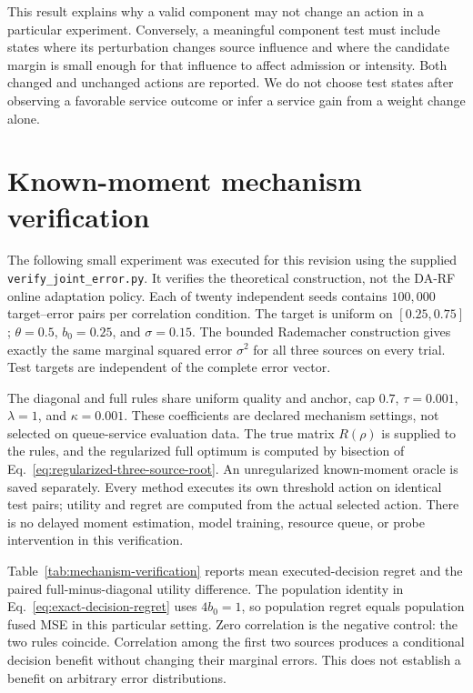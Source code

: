 This result explains why a valid component may not change an action in a
particular experiment. Conversely, a meaningful component test must include
states where its perturbation changes source influence and where the candidate
margin is small enough for that influence to affect admission or intensity.
Both changed and unchanged actions are reported. We do not choose test states
after observing a favorable service outcome or infer a service gain from a
weight change alone.

\section{Known-moment mechanism verification}
\label{sec:known-moment-verification}

The following small experiment was executed for this revision using the supplied
\texttt{verify\_joint\_error.py}. It verifies the theoretical construction,
not the DA-RF online adaptation policy. Each of twenty independent seeds
contains $100{,}000$ target--error pairs per correlation condition. The target
is uniform on $[0.25,0.75]$; $\theta=0.5$, $b_0=0.25$, and $\sigma=0.15$.
The bounded Rademacher construction gives exactly the same marginal squared
error $\sigma^2$ for all three sources on every trial. Test targets are
independent of the complete error vector.

The diagonal and full rules share uniform quality and anchor, cap $0.7$,
$\tau=0.001$, $\lambda=1$, and $\kappa=0.001$. These coefficients are declared
mechanism settings, not selected on queue-service evaluation data. The true
matrix $R(\rho)$ is supplied to the rules, and the regularized full optimum is
computed by bisection of Eq.~\eqref{eq:regularized-three-source-root}.
An unregularized known-moment oracle is saved separately. Every method executes
its own threshold action on identical test pairs; utility and regret are computed
from the actual selected action. There is no delayed moment estimation, model
training, resource queue, or probe intervention in this verification.

Table~\ref{tab:mechanism-verification} reports mean executed-decision regret
and the paired full-minus-diagonal utility difference. The population identity
in Eq.~\eqref{eq:exact-decision-regret} uses $4b_0=1$, so population regret
equals population fused MSE in this particular setting. Zero correlation is
the negative control: the two rules coincide. Correlation among the first two
sources produces a conditional decision benefit without changing their marginal
errors. This does not establish a benefit on arbitrary error distributions.

